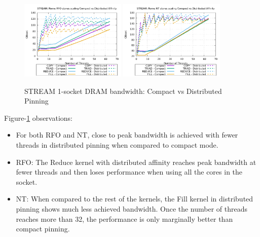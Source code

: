 \documentclass{article}
\begin{document}
\begin{figure}[!ht]
    \centering
    \includegraphics[width=0.45\textwidth]{../mem_bw_scale/Rome_scale_affinity_rfo}
    \includegraphics[width=0.45\textwidth]{../mem_bw_scale/Rome_scale_affinity_nt}
    \caption{STREAM 1-socket DRAM bandwidth: Compact vs Distributed Pinning}
    \label{figure:mem_bw_scale_affinity_rfo_nt}
\end{figure}

Figure-\ref{figure:mem_bw_scale_affinity_rfo_nt} observations:
\begin{itemize}
\item For both RFO and NT, close to peak bandwidth is achieved with fewer threads in distributed pinning when compared to compact mode.
\item RFO: The Reduce kernel with distributed affinity reaches peak bandwidth at fewer threads and then loses performance when using all the cores in the socket.
\item NT: When compared to the rest of the kernels, the Fill kernel in distributed pinning shows much less achieved bandwidth. Once the number of threads reaches more than 32, the performance is only marginally better than compact pinning.
\end{itemize}
\end{document}
